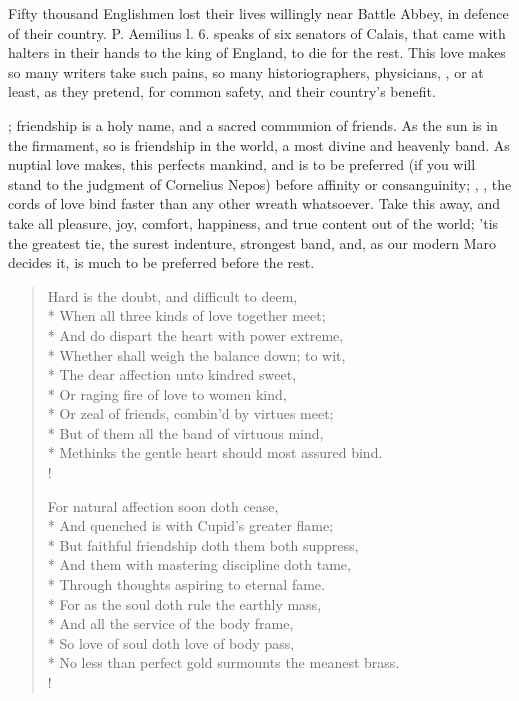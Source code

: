 {Fifty thousand Englishmen lost their lives willingly near Battle Abbey,
in defence of their country. P. Aemilius l. 6. speaks of six
senators of Calais, that came with halters in their hands to the king
of England, to die for the rest. This love makes so many writers take
such pains, so many historiographers, physicians, \etc{}, or at least, as
they pretend, for common safety, and their country's benefit.

; friendship is
a holy name, and a sacred communion of friends. As the sun is in
the firmament, so is friendship in the world, a most divine and
heavenly band. As nuptial love makes, this perfects mankind, and is to
be preferred (if you will stand to the judgment of Cornelius
Nepos) before affinity or consanguinity; , \etc{}, the cords of love bind faster
than any other wreath whatsoever. Take this away, and take all
pleasure, joy, comfort, happiness, and true content out of the world;
'tis the greatest tie, the surest indenture, strongest band, and, as
our modern Maro decides it, is much to be preferred before the rest.

\begin{verse}
Hard is the doubt, and difficult to deem,\\*
When all three kinds of love together meet;\\*
And do dispart the heart with power extreme,\\*
Whether shall weigh the balance down; to wit,\\*
The dear affection unto kindred sweet,\\*
Or raging fire of love to women kind,\\*
Or zeal of friends, combin'd by virtues meet;\\*
But of them all the band of virtuous mind,\\*
Methinks the gentle heart should most assured bind.\\!

For natural affection soon doth cease,\\*
And quenched is with Cupid's greater flame;\\*
But faithful friendship doth them both suppress,\\*
And them with mastering discipline doth tame,\\*
Through thoughts aspiring to eternal fame.\\*
For as the soul doth rule the earthly mass,\\*
And all the service of the body frame,\\*
So love of soul doth love of body pass,\\*
No less than perfect gold surmounts the meanest brass.\\!
\end{verse}

}
